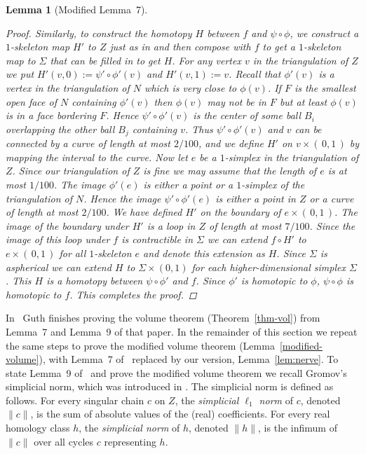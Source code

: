 \documentclass[12pt]{amsart}
\makeatletter
\newtheorem*{rep@theorem}{{Lemma} \ref##}
\newtheorem{lem}[dfn]{Lemma}
	{\newenvironment{rep{lem}}[1]{ } \begin{rep@theorem}} \end{rep@theorem}}
\numberwithin{equation}{section}
\makeatother
\begin{document}
\begin{lem}[Modified Lemma~7]
\begin{proof}
Similarly, to construct the homotopy $H$ between $f$ and $\psi\circ
  \phi$, we construct a $1$-skeleton map $H'$ to $Z$ just as in
  \cite{Guth11} and then compose with $f$ to get a $1$-skeleton map to
  $\Sigma$ that can be filled in to get $H$. For any vertex $v$ in the
  triangulation of $Z$ we put
  $H'(v,0):= \psi'\circ \phi'(v)$ and $H'(v,1):=v$. Recall that
  $\phi'(v)$ is a vertex in the triangulation of $N$ which is very close
  to $\phi(v)$.
  If $F$ is the
  smallest open face of $N$ containing $\phi'(v)$ then $\phi(v)$ may not be in
  $F$ but at least $\phi(v)$ is in a face bordering $F$. Hence $\psi'
  \circ \phi' (v)$ is the center of some ball $B_i$
  overlapping the other ball $B_j$ containing $v$. Thus $\psi'\circ
  \phi'(v)$ and $v$ can be connected by a curve of length at most
  $2/100$, and we define $H'$ on $v\times (\,0,1\, )$ by mapping the
  interval to the curve. Now let $e$ be a $1$-simplex in the
  triangulation of $Z$. Since our triangulation of $Z$ is fine we may
  assume that the length of $e$ is at most $1/100$. The image $\phi'(e)$ is either a point or a
  $1$-simplex of the triangulation of $N$. Hence the image $\psi'\circ
  \phi'(e)$ is either a point in $Z$ or a curve of length at most
  $2/100$. We have defined $H'$ on the boundary of $e\times
  (\,0,1\,)$. The image of the boundary under $H'$ is a loop in $Z$ of
  length at most $7/100$. Since the image of this loop under $f$ is
  contractible in $\Sigma$ we can extend $f \circ H'$ to $e\times (\,0,1\,)$
  for all $1$-skeleton $e$ and denote this extension as $H$. Since $\Sigma$
  is aspherical we can extend $H$ to $\Sigma \times (0,1)$ for each
  higher-dimensional simplex $\Sigma$. This $H$ is a homotopy between
  $\psi\circ \phi'$ and $f$. Since $\phi'$ is homotopic to
  $\phi$, $\psi \circ \phi$ is homotopic to $f$. This completes the proof.
  \end{proof}
 \end{lem}

In~\cite{Guth11} Guth finishes proving the volume theorem (Theorem~\ref{thm-vol}) from Lemma~7 and Lemma~9 of that paper.  In the remainder of this section we repeat the same steps to prove the modified volume theorem (Lemma~\ref{modified-volume}), with Lemma~7 of~\cite{Guth11} replaced by our version, Lemma~\ref{lem:nerve}.  To state Lemma~9 of~\cite{Guth11} and prove the modified volume theorem we recall Gromov's simplicial norm, which
was introduced in \cite{Gromov82}.
The simplicial norm is defined as follows. For every singular chain
$c$ on $Z$, the \emph{simplicial $\ell_1$ norm} of $c$, denoted $\|c\|$, is the sum of absolute
values of the (real) coefficients. For every real homology class
$h$, the \emph{simplicial norm} of $h$, denoted $\|h \|$, is the infimum of
$\| c \|$ over all cycles $c$ representing $h$.
\end{document}
